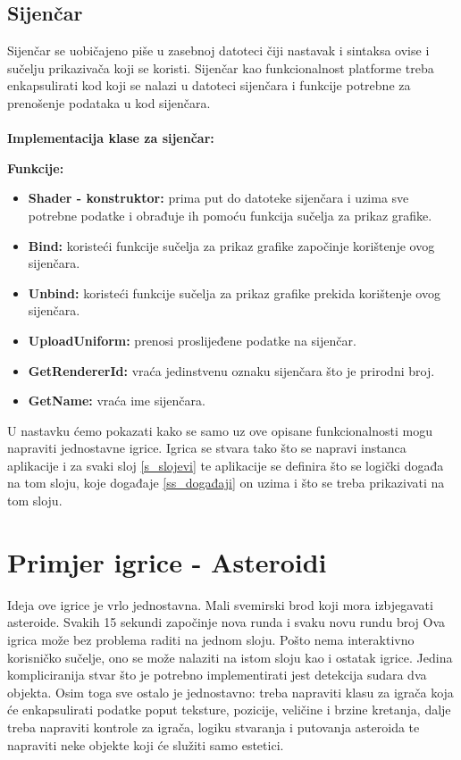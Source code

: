 \documentclass{mathos}
\begin{document}
\section{Sijenčar}
Sijenčar se uobičajeno piše u zasebnoj datoteci čiji nastavak i sintaksa ovise i sučelju prikazivača koji se koristi. Sijenčar kao funkcionalnost platforme treba enkapsulirati
kod koji se nalazi u datoteci sijenčara i funkcije potrebne za prenošenje podataka u kod sijenčara.
\\ \\
\textbf{Implementacija klase za sijenčar:}

\textbf{Funkcije: }
\begin{itemize}
    \item \textbf{Shader - konstruktor:} prima put do datoteke sijenčara i uzima sve potrebne podatke i obrađuje ih pomoću funkcija sučelja za prikaz grafike.
    \item \textbf{Bind:} koristeći funkcije sučelja za prikaz grafike započinje korištenje ovog sijenčara.
    \item \textbf{Unbind:} koristeći funkcije sučelja za prikaz grafike prekida korištenje ovog sijenčara.
    \item \textbf{UploadUniform:} prenosi proslijeđene podatke na sijenčar.
    \item \textbf{GetRendererId:} vraća jedinstvenu oznaku sijenčara što je prirodni broj.
    \item \textbf{GetName:} vraća ime sijenčara.
\end{itemize}

\noindent
U nastavku ćemo pokazati kako se samo uz ove opisane funkcionalnosti mogu napraviti jednostavne igrice.
Igrica se stvara tako što se napravi instanca aplikacije i za svaki sloj \ref{s_slojevi} te aplikacije
se definira što se logički događa na tom sloju, koje događaje \ref{ss_događaji} on uzima i što se treba prikazivati na tom sloju.

\chapter{Primjer igrice - Asteroidi}
Ideja ove igrice je vrlo jednostavna. Mali svemirski brod koji mora izbjegavati asteroide. Svakih 15 sekundi započinje nova runda i svaku novu rundu broj
Ova igrica može bez problema raditi na jednom sloju. Pošto nema interaktivno korisničko sučelje, ono se može nalaziti na istom sloju kao i ostatak igrice. Jedina kompliciranija
stvar što je potrebno implementirati jest detekcija sudara dva objekta. Osim toga sve ostalo je jednostavno: treba napraviti klasu za igrača koja će enkapsulirati podatke poput
teksture, pozicije, veličine i brzine kretanja, dalje treba napraviti kontrole za igrača, logiku stvaranja i putovanja asteroida te napraviti neke objekte koji će služiti samo
estetici.
\end{document}

